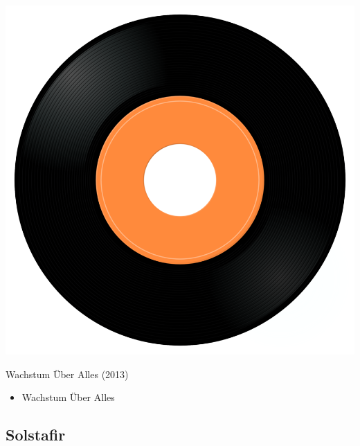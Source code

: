 \begin{minipage}[t]{0.25\textwidth}\vspace{0pt}
\captionsetup{type=figure}
\includegraphics[width=\textwidth]{Images/cover.png}
\caption*{Wachstum Über Alles (2013)}
\end{minipage}
\begin{minipage}[t]{0.25\textwidth}\vspace{0pt}
\begin{itemize}[nosep,leftmargin=1em,labelwidth=*,align=left]
	\setlength{\itemsep}{0pt}
	\item Wachstum Über Alles
\end{itemize}
\end{minipage}

\subsection{Solstafir}

